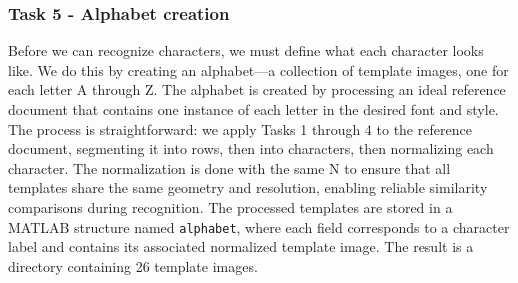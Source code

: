 \subsubsection{Task 5 - Alphabet creation}
Before we can recognize characters, we must define what each character looks like. We do this by creating an alphabet—a collection of template images, one for each letter A through Z. The alphabet is created by processing an ideal reference document that contains one instance of each letter in the desired font and style.
The process is straightforward: we apply Tasks 1 through 4 to the reference document, segmenting it into rows, then into characters, then normalizing each character.  The normalization is done with the same N to ensure that all templates share the same geometry and resolution, enabling reliable similarity comparisons during recognition.
The processed templates are stored in a MATLAB structure named \texttt{alphabet}, where each field corresponds to a character label and contains its associated normalized template image. The result is a directory containing 26 template images. 
